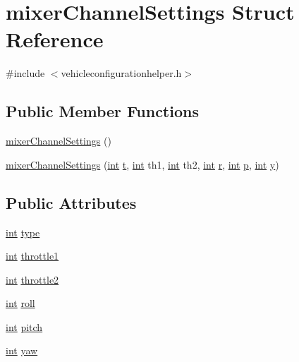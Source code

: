 \hypertarget{structmixer_channel_settings}{\section{mixer\-Channel\-Settings Struct Reference}
\label{structmixer_channel_settings}
}


{\ttfamily \#include $<$vehicleconfigurationhelper.\-h$>$}

\subsection*{Public Member Functions}
\begin{DoxyCompactItemize}
\item 
\hyperlink{group___vehicle_configuration_helper_gad16199c03ec2dcfd31a6930c77e6a073}{mixer\-Channel\-Settings} ()
\item 
\hyperlink{group___vehicle_configuration_helper_ga7dfd912206868944ab15d6bf785e2325}{mixer\-Channel\-Settings} (\hyperlink{ioapi_8h_a787fa3cf048117ba7123753c1e74fcd6}{int} \hyperlink{glext_8h_a00140d6f5c548b26daf170bf16e86a6d}{t}, \hyperlink{ioapi_8h_a787fa3cf048117ba7123753c1e74fcd6}{int} th1, \hyperlink{ioapi_8h_a787fa3cf048117ba7123753c1e74fcd6}{int} th2, \hyperlink{ioapi_8h_a787fa3cf048117ba7123753c1e74fcd6}{int} \hyperlink{glext_8h_abe08814c2f72843fde4d8df41440d5a0}{r}, \hyperlink{ioapi_8h_a787fa3cf048117ba7123753c1e74fcd6}{int} \hyperlink{glext_8h_aa5367c14d90f462230c2611b81b41d23}{p}, \hyperlink{ioapi_8h_a787fa3cf048117ba7123753c1e74fcd6}{int} \hyperlink{glext_8h_a42315f3ed8fff752bb47fd782309fcfc}{y})
\end{DoxyCompactItemize}
\subsection*{Public Attributes}
\begin{DoxyCompactItemize}
\item 
\hyperlink{ioapi_8h_a787fa3cf048117ba7123753c1e74fcd6}{int} \hyperlink{group___vehicle_configuration_helper_gae266726733ea9753d4b40ababc4ed7dd}{type}
\item 
\hyperlink{ioapi_8h_a787fa3cf048117ba7123753c1e74fcd6}{int} \hyperlink{group___vehicle_configuration_helper_ga938151d1ab96457978b7689a772b1d2f}{throttle1}
\item 
\hyperlink{ioapi_8h_a787fa3cf048117ba7123753c1e74fcd6}{int} \hyperlink{group___vehicle_configuration_helper_gaaa198e94e22ad3c7474bef8972c5e73d}{throttle2}
\item 
\hyperlink{ioapi_8h_a787fa3cf048117ba7123753c1e74fcd6}{int} \hyperlink{group___vehicle_configuration_helper_ga41061bf67fafdf170291f3a518268645}{roll}
\item 
\hyperlink{ioapi_8h_a787fa3cf048117ba7123753c1e74fcd6}{int} \hyperlink{group___vehicle_configuration_helper_gac604b2322be856866e658f6fba34c7f7}{pitch}
\item 
\hyperlink{ioapi_8h_a787fa3cf048117ba7123753c1e74fcd6}{int} \hyperlink{group___vehicle_configuration_helper_ga16a724da7162ceb2c56798d864dac807}{yaw}
\end{DoxyCompactItemize}


